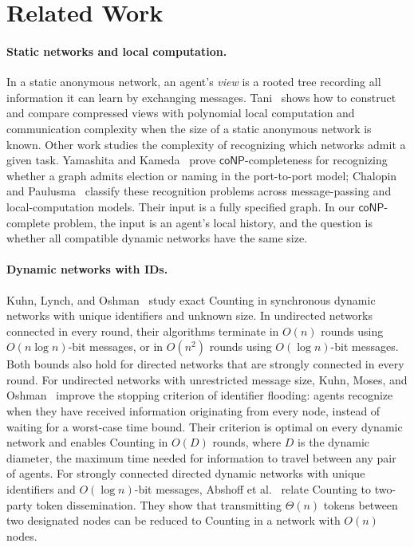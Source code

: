 \documentclass[11pt]{article}
\begin{document}
\section{Related Work}

\paragraph{Static networks and local computation.}
In a static anonymous network, an agent's \emph{view} is a
rooted tree recording all information it can learn by exchanging messages.
Tani~\cite{Tani12} shows how to construct and compare compressed views
with polynomial local computation and communication complexity when
the size of a static anonymous network is known. Other work studies
the complexity of recognizing which networks admit a given task.
Yamashita and Kameda~\cite{YK96} prove \(\mathsf{coNP}\)-completeness for recognizing
whether a graph admits election or naming in the port-to-port model;
Chalopin and Paulusma~\cite{CP11} classify these recognition problems
across message-passing and local-computation models. Their input is a
fully specified graph. In our \(\mathsf{coNP}\)-complete problem, the input is an agent's local
history, and the question is whether all compatible dynamic networks
have the same size.

\paragraph{Dynamic networks with IDs.}
Kuhn, Lynch, and Oshman~\cite{KLO10} study exact Counting in
synchronous dynamic networks with unique identifiers and unknown
size. In undirected networks connected in every round, their
algorithms terminate in $O(n)$ rounds using $O(n\log n)$-bit
messages, or in $O(n^2)$ rounds using $O(\log n)$-bit messages.
Both bounds also hold for directed networks that are strongly
connected in every round.
For undirected networks with unrestricted message size, Kuhn,
Moses, and Oshman~\cite{KMO11} improve the stopping criterion
of identifier flooding: agents recognize when they have received
information originating from every node, instead of waiting for
a worst-case time bound. Their criterion is optimal on every
dynamic network and enables Counting in $O(D)$ rounds, where $D$ is
the dynamic diameter, the maximum time needed for information
to travel between any pair of agents.
For strongly connected directed dynamic networks with unique
identifiers and $O(\log n)$-bit messages, Abshoff
et al.~\cite{ABMH13} relate Counting to two-party token
dissemination. They show that transmitting $\Theta(n)$ tokens
between two designated nodes can be reduced to Counting in a
network with $O(n)$ nodes.
\end{document}
